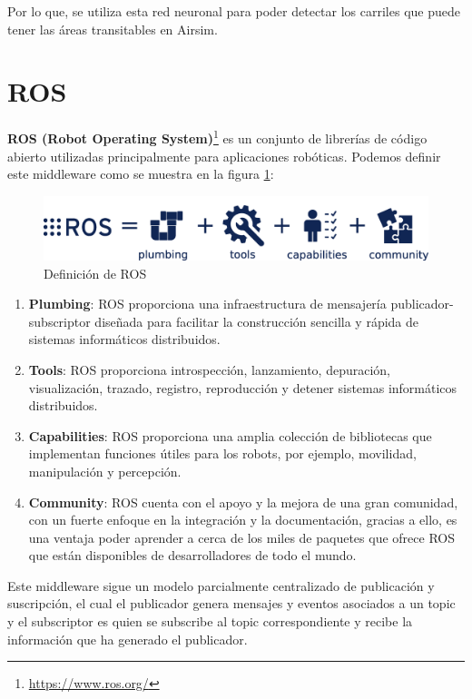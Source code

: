 Por lo que, se utiliza esta red neuronal para poder detectar los carriles que puede tener las áreas transitables en Airsim. 

\section{ROS}
\label{sec:ros}
\textbf{ROS (Robot Operating System)}\footnote{\url{https://www.ros.org/}} es un conjunto de librerías de código abierto utilizadas principalmente para aplicaciones robóticas. 
Podemos definir este middleware como se muestra en la figura \ref{fig:ROS}:

\begin{figure} [H]
    \begin{center}
      \includegraphics[scale=0.18]{figs/Plataformas_Desarollo/ros-equation.png}
    \end{center}
    \caption{Definición de ROS}
    \label{fig:ROS}
    \vspace{-1.5em}
  \end{figure}


\begin{enumerate}
    \item \textbf{Plumbing}: ROS proporciona una infraestructura de mensajería publicador-subscriptor diseñada para facilitar la construcción sencilla y rápida de sistemas informáticos
    distribuidos.
    \item \textbf{Tools}: ROS proporciona introspección, lanzamiento, depuración, visualización, trazado, registro, reproducción y detener sistemas informáticos distribuidos.
    \item \textbf{Capabilities}: ROS proporciona una amplia colección de bibliotecas que implementan funciones útiles para los robots, por ejemplo, movilidad, manipulación y percepción.
    \item \textbf{Community}: ROS cuenta con el apoyo y la mejora de una gran comunidad, con un fuerte enfoque en la integración y la documentación, gracias a ello, es una ventaja poder
    aprender a cerca de los miles de paquetes que ofrece ROS que están disponibles de desarrolladores de todo el mundo.
\end{enumerate}

Este middleware sigue un modelo parcialmente centralizado de publicación y suscripción, el cual el publicador genera mensajes y eventos asociados a un topic y el subscriptor
es quien se subscribe al topic correspondiente y recibe la información que ha generado el publicador. 

